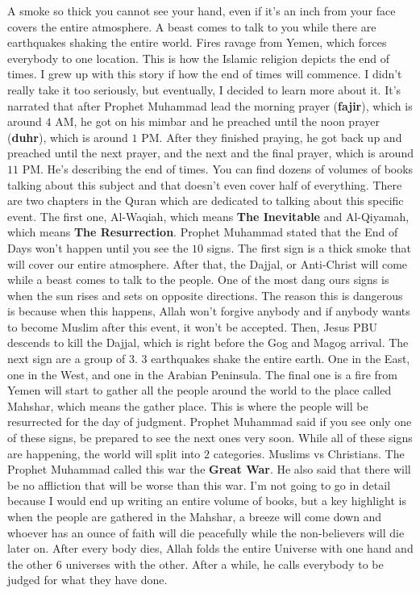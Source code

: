\begin{essay}
  A smoke so thick you cannot see your hand, even if it's an inch from your face
  covers the entire atmosphere. A beast comes to talk to you while there are
  earthquakes shaking the entire world. Fires ravage from Yemen, which forces
  everybody to one location. This is how the Islamic religion depicts the end of
  times. I grew up with this story if how the end of times will commence. I
  didn't really take it too seriously, but eventually, I decided to learn more
  about it. It's narrated that after Prophet Muhammad lead the morning prayer
  (\textbf{fajir}), which is around $4$ AM, he got on his mimbar and he preached
  until the noon prayer (\textbf{duhr}), which is around $1$ PM. After they
  finished praying, he got back up and preached until the next prayer, and the
  next and the final prayer, which is around $11$ PM. He's describing the end of
  times. You can find dozens of volumes of books talking about this subject and
  that doesn't even cover half of everything. There are two chapters in the
  Quran which are dedicated to talking about this specific event. The first one,
  Al-Waqiah, which means \textbf{The Inevitable} and Al-Qiyamah, which means
  \textbf{The Resurrection}. Prophet Muhammad stated that the End of Days won't
  happen until you see the $10$ signs. The first sign is a thick smoke that will
  cover our entire atmosphere. After that, the Dajjal, or Anti-Christ will come
  while a beast comes to talk to the people. One of the most dang ours signs is
  when the sun rises and sets on opposite directions. The reason this is
  dangerous is because when this happens, Allah won't forgive anybody and if
  anybody wants to become Muslim after this event, it won't be accepted. Then,
  Jesus PBU descends to kill the Dajjal, which is right before the Gog and Magog
  arrival. The next sign are a group of $3$. $3$ earthquakes shake the entire
  earth. One in the East, one in the West, and one in the Arabian Peninsula. The
  final one is a fire from Yemen will start to gather all the people around the
  world to the place called Mahshar, which means the gather place. This is where
  the people will be resurrected for the day of judgment. Prophet Muhammad said
  if you see only one of these signs, be prepared to see the next ones very
  soon. While all of these signs are happening, the world will split into $2$
  categories. Muslims vs Christians. The Prophet Muhammad called this war the
  \textbf{Great War}. He also said that there will be no affliction that will be
  worse than this war. I'm not going to go in detail because I would end up
  writing an entire volume of books, but a key highlight is when the people are
  gathered in the Mahshar, a breeze will come down and whoever has an ounce of
  faith will die peacefully while the non-believers will die later on. After
  every body dies, Allah folds the entire Universe with one hand and the other
  $6$ universes with the other. After a while, he calls everybody to be judged
  for what they have done.


\end{essay}
